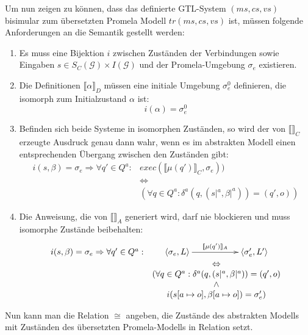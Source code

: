 Um nun zeigen zu können, dass das definierte GTL-System $(ms,cs,vs)$ bisimular zum übersetzten Promela Modell $tr(ms,cs,vs)$ ist, müssen folgende Anforderungen an die Semantik gestellt werden:
\begin{enumerate}
\item Es muss eine Bijektion $i$ zwischen Zuständen der Verbindungen sowie Eingaben $s\in S_C(\mathcal{G})\times I(\mathcal{G})$ und der Promela-Umgebung $\sigma_e$ existieren.
\item Die Definitionen $\llbracket \alpha \rrbracket_D$ müssen eine initiale Umgebung $\sigma_e^0$ definieren, die isomorph zum Initialzustand $\alpha$ ist: 
  \[ i(\alpha) = \sigma_e^0 \]
\item Befinden sich beide Systeme in isomorphen Zuständen, so wird der von $\llbracket \rrbracket_C$ erzeugte Ausdruck genau dann wahr, wenn es im abstrakten Modell einen entsprechenden Übergang zwischen den Zuständen gibt:
  \begin{equation}
    \begin{array}{rc}
      i(s,\beta) = \sigma_e \Rightarrow \forall q'\in Q^a: &
      \mathit{exec}(\llbracket \mu(q')\rrbracket_C,\sigma_e)) \\
      & \Leftrightarrow\\
      & (\forall q\in Q^a: \delta^a(q,(s|^a,\beta|^a))=(q',o))
    \end{array}
    \label{eq:assert1}
  \end{equation}
\item Die Anweisung, die von $\llbracket \rrbracket_A$ generiert wird, darf nie blockieren und muss isomorphe Zustände beibehalten:
  \begin{equation}
    \begin{array}{rc}
      i(s,\beta) = \sigma_e \Rightarrow \forall q'\in Q^a: &
      \xymatrix { \left<\sigma_e,L\right> \ar[rr]^-{\llbracket \mu(q')\rrbracket_A} & & \left<\sigma_e',L'\right> } \\
      & \Leftrightarrow\\
      & (\forall q\in Q^a: \delta^a(q,(s|^a,\beta|^a)) = (q',o)\\
      & \land\\
      & i(s[a\mapsto o],\beta[a\mapsto o]) = \sigma_e')
    \end{array}
    \label{eq:assert2}
  \end{equation}
\end{enumerate}
Nun kann man die Relation $\cong$ angeben, die Zustände des abstrakten Modells mit Zuständen des übersetzten Promela-Modells in Relation setzt.
